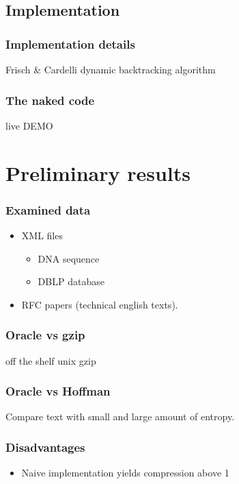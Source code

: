 \documentclass[slidestop,compress,mathserif, xcolor=table]{beamer}
\begin{document}
\subsection{Implementation}

\begin{frame}
  \frametitle{Implementation details}
  
  Frisch \& Cardelli dynamic backtracking algorithm

\end{frame}

\begin{frame}[c]
  \frametitle{The naked code}

  \begin{center}
    \Huge{live DEMO}
  \end{center}
  
\end{frame}

\section{Preliminary results}

\begin{frame}
  \frametitle{Examined data}
  \begin{itemize}
  \item XML files
    
    \begin{itemize}
    \item DNA sequence
      
    \item DBLP database
    \end{itemize}

  \item RFC papers (technical english texts).
    
  \end{itemize}
\end{frame}

\begin{frame}
  \frametitle{Oracle vs gzip}
  
  off the shelf unix gzip
\end{frame}

\begin{frame}
  \frametitle{Oracle vs Hoffman}
  Compare text with small and large amount of entropy.
\end{frame}

\begin{frame}
  \frametitle{Disadvantages}

  \begin{itemize}
  \item Naive implementation\cite{heni2010} yields compression above 1
  \end{itemize}

\end{frame}
\end{document}
